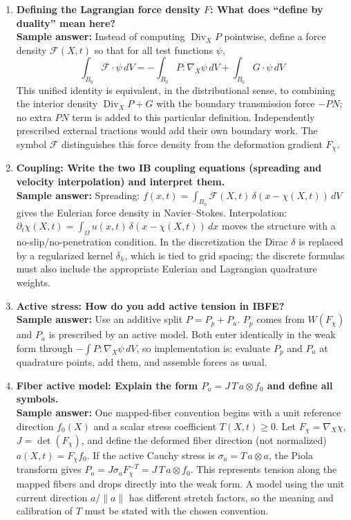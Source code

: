 \documentclass[12pt]{article}
\begin{document}
\begin{enumerate}
\item \textbf{Defining the Lagrangian force density $F$: What does ``define by duality'' mean here?}\\
\textbf{Sample answer:} Instead of computing $\operatorname{Div}_X P$ pointwise, define a force density $\mathcal F(X,t)$ so that for all
test functions $\psi$,
\[
\int_{B_0} \mathcal F\cdot \psi\, dV
= -\int_{B_0} P:\nabla_X\psi\, dV + \int_{B_0} G\cdot \psi\, dV
\]
This unified identity is equivalent, in the distributional sense, to combining the interior density
$\operatorname{Div}_X P+G$ with the boundary transmission force $-PN$; no extra $PN$ term is added to this
particular definition. Independently prescribed external tractions would add their own boundary work.
The symbol $\mathcal F$ distinguishes this force density from the deformation gradient $F_\chi$.

\item \textbf{Coupling: Write the two IB coupling equations (spreading and velocity interpolation) and interpret them.}\\
\textbf{Sample answer:} Spreading: $f(x,t)=\int_{B_0} \mathcal F(X,t)\,\delta(x-\chi(X,t))\, dV$ gives the Eulerian force density
in Navier--Stokes. Interpolation: $\partial_t \chi(X,t)=\int_\Omega u(x,t)\,\delta(x-\chi(X,t))\, dx$ moves the structure
with a no-slip/no-penetration condition. In the discretization the Dirac $\delta$ is replaced by a regularized kernel
$\delta_h$, which is tied to grid spacing; the discrete formulas must also
include the appropriate Eulerian and Lagrangian quadrature weights.

\item \textbf{Active stress: How do you add active tension in IBFE?}\\
\textbf{Sample answer:} Use an additive split $P=P_p+P_a$. $P_p$ comes from $W(F_\chi)$ and $P_a$ is prescribed by an
active model. Both enter identically in the weak form through $-\int P:\nabla_X\psi\, dV$, so implementation is: evaluate
$P_p$ and $P_a$ at quadrature points, add them, and assemble forces as usual.

\item \textbf{Fiber active model: Explain the form $P_a = J\,T\,a\otimes f_0$ and define all symbols.}\\
\textbf{Sample answer:} One mapped-fiber convention begins with a unit reference direction $f_0(X)$ and a scalar
stress coefficient $T(X,t)\ge 0$.
Let $F_\chi=\nabla_X\chi$, $J=\det(F_\chi)$, and define the deformed fiber direction (not normalized) $a(X,t)=F_\chi f_0$.
If the active Cauchy stress is $\sigma_a=T\,a\otimes a$, the Piola transform gives
$P_a=J\sigma_aF_\chi^{-T}=J\,T\,a\otimes f_0$. This represents tension along the mapped fibers and drops directly
into the weak form. A model using the unit current direction $a/\lVert a\rVert$ has different stretch factors, so the
meaning and calibration of $T$ must be stated with the chosen convention.


\end{enumerate}
\end{document}
